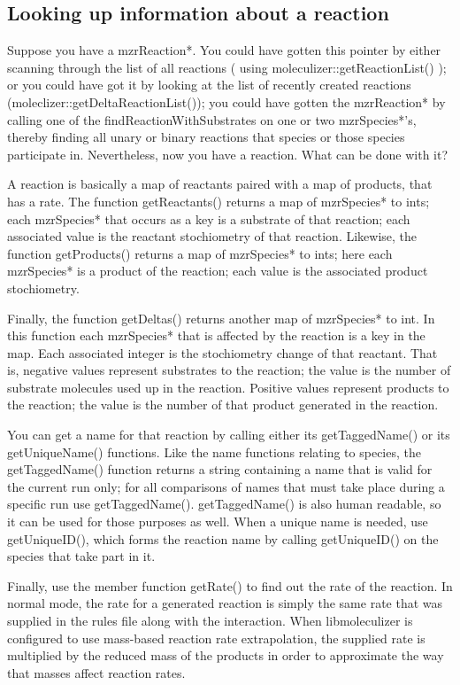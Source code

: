 \subsection{Looking up information about a reaction}
Suppose you have a mzrReaction*.  You could have gotten this pointer
by either scanning through the list of all reactions ( using
moleculizer::getReactionList() ); or you could have got it by looking
at the list of recently created reactions
(moleclizer::getDeltaReactionList()); you could have gotten the
mzrReaction* by calling one of the findReactionWithSubstrates on one
or two mzrSpecies*'s, thereby finding all unary or binary reactions
that species or those species participate in.  Nevertheless, now you
have a reaction.  What can be done with it?

A reaction is basically a map of reactants paired with a map of
products, that has a rate.  The function getReactants() returns a map
of mzrSpecies* to ints; each mzrSpecies* that occurs as a key is a
substrate of that reaction; each associated value is the reactant
stochiometry of that reaction.  Likewise, the function getProducts()
returns a map of mzrSpecies* to ints; here each mzrSpecies* is a
product of the reaction; each value is the associated product
stochiometry.  

Finally, the function getDeltas() returns another map
of mzrSpecies* to int.  In this function each mzrSpecies* that is
affected by the reaction is a key in the map.  Each associated integer
is the stochiometry change of that reactant.  That is, negative values
represent substrates to the reaction; the value is the number of
substrate molecules used up in the reaction.  Positive values
represent products to the reaction; the value is the number of that
product generated in the reaction.  

You can get a name for that reaction by calling either its
getTaggedName() or its getUniqueName() functions.  Like the name
functions relating to species, the getTaggedName() function returns a
string containing a name that is valid for the current run only; for
all comparisons of names that must take place during a specific run
use getTaggedName().  getTaggedName() is also human readable, so it
can be used for those purposes as well.  When a unique name is needed,
use getUniqueID(), which forms the reaction name by calling
getUniqueID() on the species that take part in it.  

Finally, use the member function getRate() to find out the rate of the
reaction.  In normal mode, the rate for a generated reaction is simply
the same rate that was supplied in the rules file along with the
interaction.  When libmoleculizer is configured to use mass-based
reaction rate extrapolation, the supplied rate is multiplied by the
reduced mass of the products in order to approximate the way that
masses affect reaction rates.  

